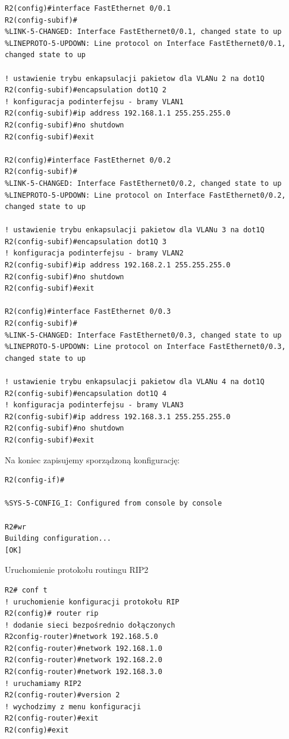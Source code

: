 \documentclass[polish,11pt,a4paper,twoside]{article}
\begin{document}
\begin{lstlisting}
R2(config)#interface FastEthernet 0/0.1
R2(config-subif)#
%LINK-5-CHANGED: Interface FastEthernet0/0.1, changed state to up
%LINEPROTO-5-UPDOWN: Line protocol on Interface FastEthernet0/0.1, changed state to up

! ustawienie trybu enkapsulacji pakietow dla VLANu 2 na dot1Q
R2(config-subif)#encapsulation dot1Q 2
! konfiguracja podinterfejsu - bramy VLAN1
R2(config-subif)#ip address 192.168.1.1 255.255.255.0
R2(config-subif)#no shutdown 
R2(config-subif)#exit

R2(config)#interface FastEthernet 0/0.2
R2(config-subif)#
%LINK-5-CHANGED: Interface FastEthernet0/0.2, changed state to up
%LINEPROTO-5-UPDOWN: Line protocol on Interface FastEthernet0/0.2, changed state to up

! ustawienie trybu enkapsulacji pakietow dla VLANu 3 na dot1Q
R2(config-subif)#encapsulation dot1Q 3
! konfiguracja podinterfejsu - bramy VLAN2
R2(config-subif)#ip address 192.168.2.1 255.255.255.0
R2(config-subif)#no shutdown 
R2(config-subif)#exit

R2(config)#interface FastEthernet 0/0.3
R2(config-subif)#
%LINK-5-CHANGED: Interface FastEthernet0/0.3, changed state to up
%LINEPROTO-5-UPDOWN: Line protocol on Interface FastEthernet0/0.3, changed state to up

! ustawienie trybu enkapsulacji pakietow dla VLANu 4 na dot1Q
R2(config-subif)#encapsulation dot1Q 4
! konfiguracja podinterfejsu - bramy VLAN3
R2(config-subif)#ip address 192.168.3.1 255.255.255.0
R2(config-subif)#no shutdown 
R2(config-subif)#exit
\end{lstlisting}
Na koniec zapisujemy sporządzoną konfigurację:
\begin{lstlisting}
R2(config-if)#

%SYS-5-CONFIG_I: Configured from console by console

R2#wr
Building configuration...
[OK]
\end{lstlisting}
Uruchomienie protokołu routingu RIP2 
\begin{lstlisting}
R2# conf t
! uruchomienie konfiguracji protokołu RIP
R2(config)# router rip
! dodanie sieci bezpośrednio dołączonych
R2config-router)#network 192.168.5.0
R2(config-router)#network 192.168.1.0
R2(config-router)#network 192.168.2.0
R2(config-router)#network 192.168.3.0
! uruchamiamy RIP2
R2(config-router)#version 2
! wychodzimy z menu konfiguracji
R2(config-router)#exit
R2(config)#exit
\end{lstlisting}
\end{document}
